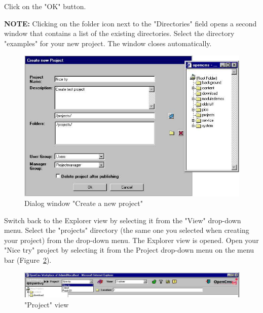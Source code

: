 Click on the "OK" button.

\textbf{NOTE:} Clicking on the folder icon next to the
"Directories" field opens a second window that contains a list of
the existing directories. Select the directory "examples" for your
new project. The window closes automatically.

\begin{figure}[hbt]
\begin{center}
\includegraphics[width=\sgw]
                   {pics/usermanual/newProject}
\caption[Dialog window "Create a new project"]
           {Dialog window "Create a new project"}
\label{createnewproject}
\end{center}
\end{figure}

Switch back to the Explorer view by selecting it from the "View"
drop-down menu. Select the "projects" directory (the same one you
selected when creating your project) from the drop-down menu. The
Explorer view is opened. Open your "Nice try" project by selecting
it from the Project drop-down menu on the menu bar
(Figure~\ref{projectview}).

\begin{figure}[hbt]
\begin{center}
\includegraphics[width=\sgw]
                   {pics/usermanual/projectView}
\caption["Project" view]
           {"Project" view}
\label{projectview}
\end{center}
\end{figure}


